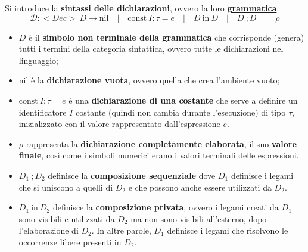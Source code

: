 \documentclass[a4paper]{article}
\begin{document}
	\noindent
	Si introduce la \textbf{sintassi delle dichiarazioni}, ovvero la loro \underline{\textbf{grammatica}}:
	\begin{equation*}
		\mathcal{D}: <Dec> \: D \rightarrow \mathrm{nil} \hspace{1em} | \hspace{1em} \mathrm{const} \: I:\tau = e \hspace{1em} | \hspace{1em} D \: \mathrm{in} \: D \hspace{1em} | \hspace{1em} D \: ; D \hspace{1em} | \hspace{1em} \rho
	\end{equation*}
	\begin{itemize}
		\item $D$ è il \textbf{simbolo non terminale della grammatica} che corrisponde (genera) tutti i termini della categoria sintattica, ovvero tutte le dichiarazioni nel linguaggio;
		
		\item $\mathrm{nil}$ è la \textbf{dichiarazione vuota}, ovvero quella che crea l'ambiente vuoto;
		
		\item $\mathrm{const} \: I:\tau = e$ è una \textbf{dichiarazione di una costante} che serve a definire un identificatore $I$ costante (quindi non cambia durante l'esecuzione) di tipo $\tau$, inizializzato con il valore rappresentato dall'espressione $e$.
		
		\item $\rho$ rappresenta la \textbf{dichiarazione completamente elaborata}, il suo \textbf{valore finale}, così come i simboli numerici erano i valori terminali delle espressioni.
		
		\item $D_{1} \: ; D_{2}$ definisce la \textbf{composizione sequenziale} dove $D_{1}$ definisce i legami che si uniscono a quelli di $D_{2}$ e che possono anche essere utilizzati da $D_{2}$.
		
		\item $D_{1} \: \mathrm{in} \: D_{2}$ definisce la \textbf{composizione privata}, ovvero i legami creati da $D_{1}$ sono visibili e utilizzati da $D_{2}$ ma non sono visibili all'esterno, dopo l'elaborazione di $D_{2}$. In altre parole, $D_{1}$ definisce i legami che risolvono le occorrenze libere presenti in $D_{2}$.
	\end{itemize}
	
\end{document}
